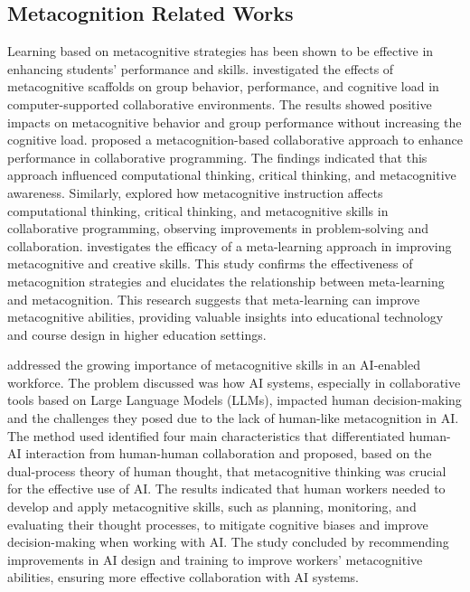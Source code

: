 \documentclass[runningheads]{llncs}
\begin{document}
\subsection{Metacognition Related Works}

Learning based on metacognitive strategies has been shown to be effective in
enhancing students’ performance and skills. \cite{Zheng19} investigated the
effects of metacognitive scaffolds on group behavior, performance, and cognitive
load in computer-supported collaborative environments. The results showed
positive impacts on metacognitive behavior and group performance without
increasing the cognitive load. \cite{LiWei23} proposed a metacognition-based
collaborative approach to enhance performance in collaborative programming. The
findings indicated that this approach influenced computational thinking,
critical thinking, and metacognitive awareness. Similarly, \cite{Wang23}
explored how metacognitive instruction affects computational thinking, critical
thinking, and metacognitive skills in collaborative programming, observing
improvements in problem-solving and collaboration. \cite{Khusnul24} investigates
the efficacy of a meta-learning approach in improving metacognitive and creative
skills. This study confirms the effectiveness of metacognition strategies and
elucidates the relationship between meta-learning and metacognition. This
research suggests that meta-learning can improve metacognitive abilities,
providing valuable insights into educational technology and course design in
higher education settings.

\cite{Sidra24} addressed the growing importance of metacognitive skills in an
AI-enabled workforce. The problem discussed was how AI systems, especially in
collaborative tools based on Large Language Models (LLMs), impacted human
decision-making and the challenges they posed due to the lack of human-like
metacognition in AI. The method used identified four main characteristics that
differentiated human-AI interaction from human-human collaboration and proposed,
based on the dual-process theory of human thought, that metacognitive thinking
was crucial for the effective use of AI. The results indicated that human
workers needed to develop and apply metacognitive skills, such as planning,
monitoring, and evaluating their thought processes, to mitigate cognitive biases
and improve decision-making when working with AI. The study concluded by
recommending improvements in AI design and training to improve workers'
metacognitive abilities, ensuring more effective collaboration with AI systems.
\end{document}
